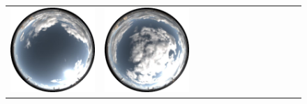 \begin{figure}[!ht]
\begin{tabular}{@{}rcccccccccccc@{}}
    \includegraphics[width=\customwidth]{./figures/reconstruction/envmaps/20141011_142928.jpg} &
    \includegraphics[width=\customwidth]{./figures/reconstruction/envmaps/20141011_145928.jpg} &

\end{tabular}
\end{figure}
